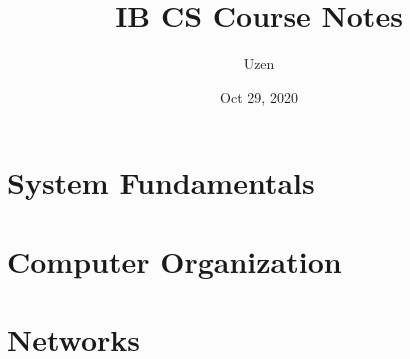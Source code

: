 \documentclass{report}
\title{IB CS Course Notes}
\author{Uzen}
\date{Oct 29, 2020}
\begin{document}
\maketitle
\tableofcontents

\newpage

\chapter{System Fundamentals}


\chapter{Computer Organization}


\chapter{Networks}


% 
\end{document}
